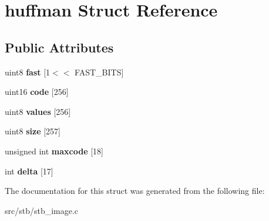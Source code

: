 \hypertarget{structhuffman}{}\section{huffman Struct Reference}
\label{structhuffman}
\subsection*{Public Attributes}
\begin{DoxyCompactItemize}
\item 
\mbox{\label{structhuffman_a9dbb29a8ed724a32f502d9595510ddc2}} 
uint8 {\bfseries fast} \mbox{[}1$<$$<$ F\+A\+S\+T\+\_\+\+B\+I\+TS\mbox{]}
\item 
\mbox{\label{structhuffman_a9925018a95d5a2122cd732561fa0fa64}} 
uint16 {\bfseries code} \mbox{[}256\mbox{]}
\item 
\mbox{\label{structhuffman_a313d78cf23f40b314c25681ff2a6224b}} 
uint8 {\bfseries values} \mbox{[}256\mbox{]}
\item 
\mbox{\label{structhuffman_afdb0fbcf25aec42ba30b0d0e2453a057}} 
uint8 {\bfseries size} \mbox{[}257\mbox{]}
\item 
\mbox{\label{structhuffman_aeb78aca6c7377faaad8123566d54fc98}} 
unsigned int {\bfseries maxcode} \mbox{[}18\mbox{]}
\item 
\mbox{\label{structhuffman_a04255e3e1c6de74d36a08a1aa4e9537d}} 
int {\bfseries delta} \mbox{[}17\mbox{]}
\end{DoxyCompactItemize}


The documentation for this struct was generated from the following file\+:\begin{DoxyCompactItemize}
\item 
src/stb/stb\+\_\+image.\+c\end{DoxyCompactItemize}
